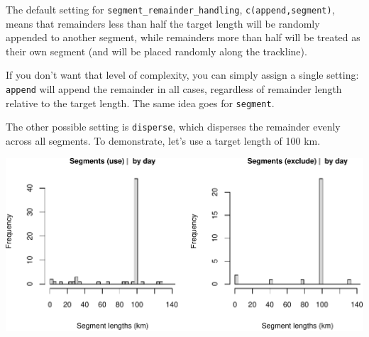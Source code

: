 \documentclass[
]{book}
\newenvironment{Shaded}{\begin{snugshade}}{\end{snugshade}}
\newcommand{\CommentTok}[1]{\textcolor[rgb]{0.56,0.35,0.01}{\textit{#1}}}
\newcommand{\DataTypeTok}[1]{\textcolor[rgb]{0.13,0.29,0.53}{#1}}
\newcommand{\DecValTok}[1]{\textcolor[rgb]{0.00,0.00,0.81}{#1}}
\newcommand{\KeywordTok}[1]{\textcolor[rgb]{0.13,0.29,0.53}{\textbf{#1}}}
\newcommand{\NormalTok}[1]{#1}
\newcommand{\OperatorTok}[1]{\textcolor[rgb]{0.81,0.36,0.00}{\textbf{#1}}}
\newcommand{\OtherTok}[1]{\textcolor[rgb]{0.56,0.35,0.01}{#1}}
\newcommand{\StringTok}[1]{\textcolor[rgb]{0.31,0.60,0.02}{#1}}
\begin{document}
The default setting for \texttt{segment\_remainder\_handling}, \texttt{c(\textquotesingle{}append\textquotesingle{},\textquotesingle{}segment\textquotesingle{})}, means that remainders less than half the target length will be randomly appended to another segment, while remainders more than half will be treated as their own segment (and will be placed randomly along the trackline).

If you don't want that level of complexity, you can simply assign a single setting: \texttt{\textquotesingle{}append\textquotesingle{}} will append the remainder in all cases, regardless of remainder length relative to the target length. The same idea goes for \texttt{\textquotesingle{}segment\textquotesingle{}}.

The other possible setting is \texttt{\textquotesingle{}disperse\textquotesingle{}}, which disperses the remainder evenly across all segments. To demonstrate, let's use a target length of 100 km.

\begin{Shaded}
\end{Shaded}

\includegraphics{figures/unnamed-chunk-145-1.pdf}
\end{document}
